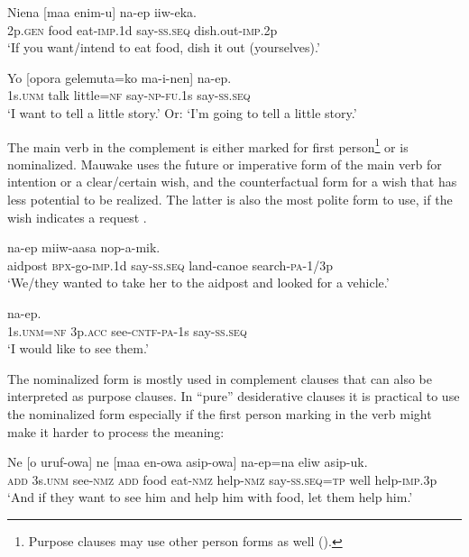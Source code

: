 \ea%
\label{ex:8:x367}
\gll Niena  [maa  enim-u]  na-ep  iiw-eka. \\
2p.\textsc{gen} food eat-\textsc{imp}.1d say-\textsc{ss}.\textsc{seq} dish.out-\textsc{imp}.2p\\
\glt`If you want/intend to eat food, dish it out (yourselves).'
\z


\ea%
\label{ex:8:x368}
\gll Yo  [opora  gelemuta=ko  ma-i-nen]  na-ep.\\
1s.\textsc{unm} talk  little=\textsc{nf} say-\textsc{np}-\textsc{fu}.1s  say-\textsc{ss}.\textsc{seq}\\
\glt`I want to tell a little story.' Or: `I'm going to tell a little story.'
\z


The main verb in the complement is either marked for first person\footnote{Purpose clauses may use other person forms as well ().} or is nominalized. Mauwake uses the future  or imperative form  of the main verb for intention or a clear/certain wish, and the counterfactual form for a wish that has less potential to be realized. The latter is also the most polite form to use, if the wish indicates a request . 

\ea%
\label{ex:8:x369}
\gll [Haussik  p-ek-u]  na-ep  miiw-aasa  nop-a-mik.\\
aidpost \textsc{\textsc{bp}x}-go-\textsc{imp}.1d say-\textsc{ss}.\textsc{seq} land-canoe search-\textsc{pa}-1/3p\\
\glt`We/they wanted to take her to the aidpost and looked for a vehicle.'
\z


\ea%
\label{ex:8:x370}
\gll [Yo=ko  wia  uruf-ek-a-m] na-ep.\\
1s.\textsc{unm}=\textsc{nf} 3p.\textsc{acc} see-\textsc{cntf}-\textsc{pa}-1s say-\textsc{ss}.\textsc{seq}\\
\glt`I would like to see them.'
\z


The nominalized form is mostly used in complement clauses that can also be interpreted as purpose clauses. In ``pure'' desiderative clauses it is practical to use the nominalized form especially if the first person marking in the verb might make it harder to process the meaning:

\ea%
\label{ex:8:x1610}
\gll Ne  [o  uruf-owa]  ne  [maa  en-owa  asip-owa] na-ep=na  eliw  asip-uk.\\
\textsc{add} 3s.\textsc{unm} see-\textsc{nmz} \textsc{add} food  eat-\textsc{nmz} help-\textsc{nmz} say-\textsc{ss}.\textsc{seq}=\textsc{tp} well help-\textsc{imp}.3p\\
\glt`And if they want to see him and help him with food, let them help him.'
\z


